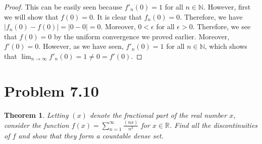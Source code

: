 \documentclass[psamsfonts]{amsart}
\newtheorem{thm}{Theorem}[section]
\theoremstyle{definition}
\theoremstyle{remark}
\numberwithin{equation}{section}
\begin{document}
\begin{proof}
This can be easily seen because $f'_n(0) = 1$ for all $n \in \mathbb{N}$. However, first we will show that $f(0) = 0$. It is clear that $f_n(0) = 0$. Therefore, we have $|f_n(0) - f(0)| = |0 - 0| = 0$. Moreover, $0 < \epsilon$ for all $\epsilon > 0$. Therefore, we see that $f(0) = 0$ by the uniform convergence we proved earlier. Moreover, $f'(0) = 0$. However, as we have seen, $f'_n(0) = 1$ for all $n \in \mathbb{N}$, which shows that $\lim_{n \to \infty} f'_n(0) = 1 \neq 0 = f'(0)$. 
\end{proof}

\section{Problem 7.10}

\begin{thm}
Letting $(x)$ denote the fractional part of the real number $x$, consider the function $f(x) = \sum_{n=1}^\infty \frac{(nx)}{n^2}$ for $x \in \mathbb{R}$. Find all the discontinuities of $f$ and show that they form a countable dense set. 
\end{thm}
\end{document}
